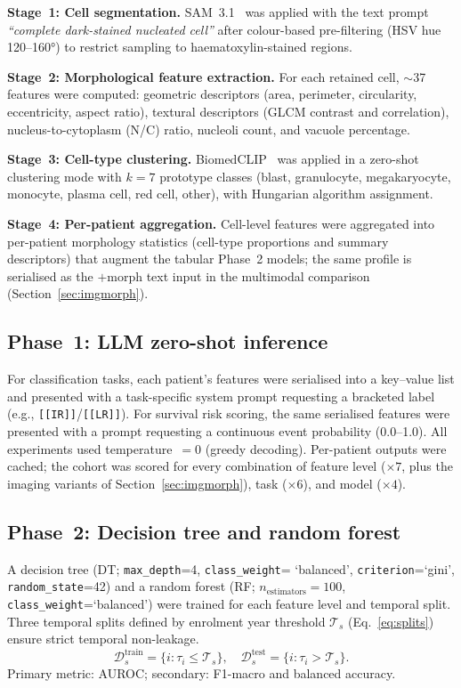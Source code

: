 \documentclass[pdflatex,sn-nature]{sn-jnl}
\begin{document}
\textbf{Stage~1: Cell segmentation.}
SAM~3.1~\cite{[CITE:SAM]} was applied with the text prompt
\textit{``complete dark-stained nucleated cell''} after colour-based
pre-filtering (HSV hue 120--160°) to restrict sampling to
haematoxylin-stained regions.

\textbf{Stage~2: Morphological feature extraction.}
For each retained cell, $\sim$37 features were computed: geometric
descriptors (area, perimeter, circularity, eccentricity, aspect ratio),
textural descriptors (GLCM contrast and correlation), nucleus-to-cytoplasm
(N/C) ratio, nucleoli count, and vacuole percentage.

\textbf{Stage~3: Cell-type clustering.}
BiomedCLIP~\cite{[CITE:BiomedCLIP]} was applied in a zero-shot
clustering mode with $k=7$ prototype classes (blast, granulocyte,
megakaryocyte, monocyte, plasma cell, red cell, other), with Hungarian
algorithm assignment.

\textbf{Stage~4: Per-patient aggregation.}
Cell-level features were aggregated into per-patient morphology
statistics (cell-type proportions and summary descriptors) that augment
the tabular Phase~2 models; the same profile is serialised as the
$+$morph text input in the multimodal comparison
(Section~\ref{sec:imgmorph}).

\subsection{Phase~1: LLM zero-shot inference}\label{sec:llm_inference}

For classification tasks, each patient's features were serialised into a
key--value list and presented with a task-specific system prompt
requesting a bracketed label (e.g., \texttt{[[IR]]}/\texttt{[[LR]]}).
For survival risk scoring, the same serialised features were presented
with a prompt requesting a continuous event probability (0.0--1.0).
All experiments used temperature~$=0$ (greedy decoding).
Per-patient outputs were cached; the cohort was scored for every
combination of feature level ($\times 7$, plus the imaging variants of
Section~\ref{sec:imgmorph}), task ($\times 6$), and model ($\times 4$).

\subsection{Phase~2: Decision tree and random forest}\label{sec:dt}

A decision tree (DT; \texttt{max\_depth}=4, \texttt{class\_weight}=%
`balanced', \texttt{criterion}=`gini', \texttt{random\_state}=42)
and a random forest (RF; $n_\text{estimators}=100$,
\texttt{class\_weight}=`balanced') were trained for each feature level
and temporal split.
Three temporal splits defined by enrolment year threshold $\mathcal{T}_s$
(Eq.~\ref{eq:splits}) ensure strict temporal non-leakage.
\begin{equation}
\mathcal{D}_s^{\text{train}} = \{i : \tau_i \leq \mathcal{T}_s\},
\quad
\mathcal{D}_s^{\text{test}} = \{i : \tau_i > \mathcal{T}_s\}.
\label{eq:splits}
\end{equation}
Primary metric: AUROC; secondary: F1-macro and balanced accuracy.
\end{document}
